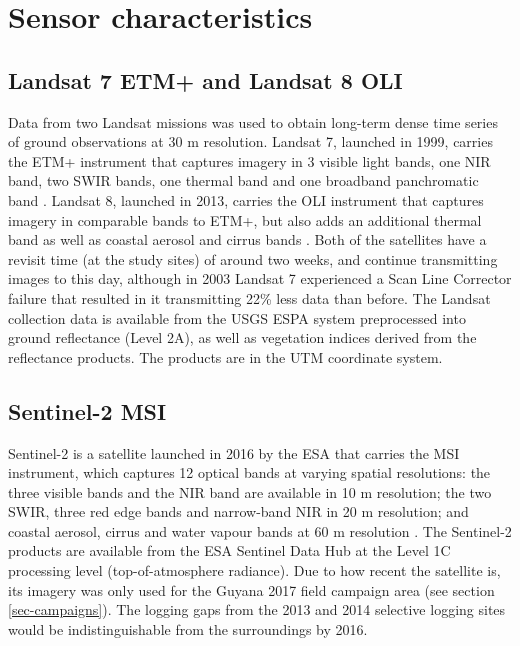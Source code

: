 \documentclass[a4paper,12pt]{scrbook}
\begin{document}
\section{Sensor characteristics}

\subsection{Landsat 7 ETM+ and Landsat 8 OLI}

Data from two Landsat missions was used to obtain long-term dense time series of ground observations at 30 m resolution. Landsat 7, launched in 1999, carries the \ac{ETM+} instrument that captures imagery in 3 visible light bands, one \ac{NIR} band, two \ac{SWIR} bands, one thermal band and one broadband panchromatic band \citep{u.s._geological_survey_product_2017_2}. Landsat 8, launched in 2013, carries the \ac{OLI} instrument that captures imagery in comparable bands to \ac{ETM+}, but also adds an additional thermal band as well as coastal aerosol and cirrus bands \citep{u.s._geological_survey_product_2017}. Both of the satellites have a revisit time (at the study sites) of around two weeks, and continue transmitting images to this day, although in 2003 Landsat 7 experienced a Scan Line Corrector failure that resulted in it transmitting 22\% less data than before. The Landsat collection data is available from the \ac{USGS} \ac{ESPA} system preprocessed into ground reflectance (Level 2A), as well as vegetation indices derived from the reflectance products. The products are in the \ac{UTM} coordinate system.

\subsection{Sentinel-2 MSI}

Sentinel-2 is a satellite launched in 2016 by the \ac{ESA} that carries the \ac{MSI} instrument, which captures 12 optical bands at varying spatial resolutions: the three visible bands and the \ac{NIR} band are available in 10 m resolution; the two \ac{SWIR}, three red edge bands and narrow-band \ac{NIR} in 20 m resolution; and coastal aerosol, cirrus and water vapour bands at 60 m resolution \citep{suhet_sentinel-2_2015}. The Sentinel-2 products are available from the \ac{ESA} Sentinel Data Hub at the Level 1C processing level (top-of-atmosphere radiance). Due to how recent the satellite is, its imagery was only used for the Guyana 2017 field campaign area (see section \ref{sec-campaigns}). The logging gaps from the 2013 and 2014 selective logging sites would be indistinguishable from the surroundings by 2016.
\end{document}
